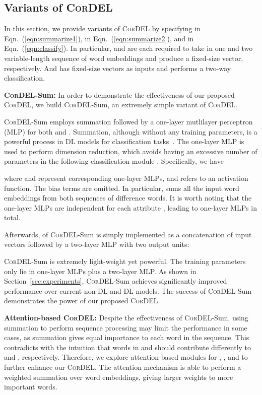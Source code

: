 \documentclass[conference]{IEEEtran}
\begin{document}
\subsection{Variants of \textsc{CorDEL}}\label{sec:CorDEL_variants}

In this section, we provide variants of \textsc{CorDEL} by specifying  in Eqn.~(\ref{eqn:summarize1}),  in Eqn.~(\ref{eqn:summarize2}), and  in Eqn.~(\ref{eqn:classify}). In particular,  and  are each required to take in one and two variable-length sequence of word embeddings and produce a fixed-size vector, respectively. And  has  fixed-size vectors as inputs and performs a two-way classification.

\textbf{\textsc{CorDEL}-Sum:} In order to demonstrate the effectiveness of our proposed \textsc{CorDEL}, we build \textsc{CorDEL}-Sum, an extremely simple variant of \textsc{CorDEL}.

\textsc{CorDEL}-Sum employs summation followed by a one-layer mutlilayer perceptron (MLP) for both  and . Summation, although without any training parameters, is a powerful process in DL models for classification tasks~\cite{joulin2017bag,xu2019powerful}. The one-layer MLP is used to perform dimension reduction, which avoids having an excessive number of parameters in the following classification module . Specifically, we have

where  and  represent corresponding one-layer MLPs, and  refers to an activation function. The bias terms are omitted. In particular,  sums all the input word embeddings from both sequences of difference words. It is worth noting that the one-layer MLPs are independent for each attribute , leading to  one-layer MLPs in total. 

Afterwards,  of \textsc{CorDEL}-Sum is simply implemented as a concatenation of  input vectors followed by a two-layer MLP with two output units:


\textsc{CorDEL}-Sum is extremely light-weight yet powerful. The training parameters only lie in  one-layer MLPs plus a two-layer MLP. As shown in Section~\ref{sec:experiments}, \textsc{CorDEL}-Sum achieves significantly improved performance over current non-DL and DL models. The success of \textsc{CorDEL}-Sum demonstrates the power of our proposed \textsc{CorDEL}.

\textbf{Attention-based \textsc{CorDEL}:} Despite the effectiveness of \textsc{CorDEL}-Sum, using summation to perform sequence processing may limit the performance in some cases, as summation gives equal importance to each word in the sequence. This contradicts with the intuition that words in  and  should contribute differently to  and , respectively. Therefore, we explore attention-based modules for , , and  to further enhance our \textsc{CorDEL}. The attention mechanism is able to perform a weighted summation over word embeddings, giving larger weights to more important words. 
\end{document}
